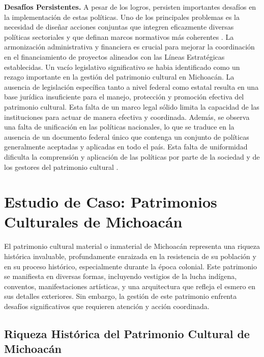 \documentclass[
  spanish,
  11pt,
  a4paper,
]{scrbook}
\begin{document}
\textbf{Desafíos Persistentes.} A pesar de los logros, persisten
importantes desafíos en la implementación de estas políticas. Uno de los
principales problemas es la necesidad de diseñar acciones conjuntas que
integren eficazmente diversas políticas sectoriales y que definan marcos
normativos más coherentes \autocite{Subirats2008}. La armonización
administrativa y financiera es crucial para mejorar la coordinación en
el financiamiento de proyectos alineados con las Líneas Estratégicas
establecidas. Un vacío legislativo significativo se habia identificado
como un rezago importante en la gestión del patrimonio cultural en
Michoacán. La ausencia de legislación específica tanto a nivel federal
como estatal resulta en una base jurídica insuficiente para el manejo,
protección y promoción efectiva del patrimonio cultural. Esta falta de
un marco legal sólido limita la capacidad de las instituciones para
actuar de manera efectiva y coordinada. Además, se observa una falta de
unificación en las políticas nacionales, lo que se traduce en la
ausencia de un documento federal único que contenga un conjunto de
políticas generalmente aceptadas y aplicadas en todo el país. Esta falta
de uniformidad dificulta la comprensión y aplicación de las políticas
por parte de la sociedad y de los gestores del patrimonio cultural
\autocite{TorresTurismo2022}.

\section*{Estudio de Caso: Patrimonios Culturales de
Michoacán}\label{estudio-de-caso-patrimonios-culturales-de-michoacuxe1n}


El patrimonio cultural material o inmaterial de Michoacán representa una
riqueza histórica invaluable, profundamente enraizada en la resistencia
de su población y en su proceso histórico, especialmente durante la
época colonial. Este patrimonio se manifiesta en diversas formas,
incluyendo vestigios de la lucha indígena, conventos, manifestaciones
artísticas, y una arquitectura que refleja el esmero en sus detalles
exteriores. Sin embargo, la gestión de este patrimonio enfrenta desafíos
significativos que requieren atención y acción coordinada.

\subsection*{Riqueza Histórica del Patrimonio Cultural de
Michoacán}\label{riqueza-histuxf3rica-del-patrimonio-cultural-de-michoacuxe1n}
\end{document}
